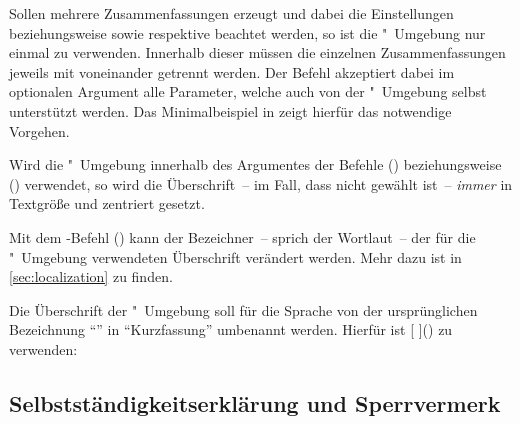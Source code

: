 \begin{DeclareEntity*}{}
\begin{DeclareEntity*}{}
\begin{DeclareEntity*}{}
\begin{Declaration}
\begin{Declaration}
\begin{Declaration}
\begin{Declaration}
\begin{Declaration}
\begin{Declaration}
\begin{Declaration}
%
Sollen mehrere Zusammenfassungen erzeugt und dabei die Einstellungen 
 beziehungsweise  sowie 
 respektive  beachtet werden, so 
ist die "~Umgebung nur einmal zu verwenden. Innerhalb 
dieser müssen die einzelnen Zusammenfassungen jeweils mit  
voneinander getrennt werden. Der Befehl akzeptiert dabei im optionalen Argument 
alle Parameter, welche auch von der "~Umgebung selbst 
unterstützt werden. Das Minimalbeispiel in  
zeigt hierfür das notwendige Vorgehen.

Wird die "~Umgebung innerhalb des Argumentes der Befehle 
() beziehungsweise 
() verwendet, so wird die 
Überschrift~-- im Fall, dass nicht  gewählt ist~-- 
\emph{immer} in Textgröße und zentriert gesetzt.
\end{Declaration}
\end{Declaration}
\end{Declaration}
\end{Declaration}
\end{Declaration}
\end{Declaration}
\end{Declaration}



Mit dem \KOMAScript-Befehl ()
kann der Bezeichner~-- sprich der Wortlaut~-- der für die 
"~Umgebung verwendeten Überschrift verändert werden. Mehr 
dazu ist in \autoref{sec:localization} zu finden.
%
\begin{Example}
Die Überschrift der "~Umgebung soll für die Sprache 
 von der ursprünglichen Bezeichnung \enquote{\abstractname} in 
\enquote{Kurzfassung} umbenannt werden. Hierfür ist 
[%
]() zu verwenden:%
\begin{Code}
\end{Code}
\end{Example}
%



\subsection{%
  Selbstständigkeitserklärung und Sperrvermerk%
}


\end{DeclareEntity*}
\end{DeclareEntity*}
\end{DeclareEntity*}
